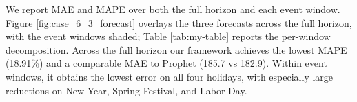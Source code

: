 \documentclass{article}
\theoremstyle{plain}
\theoremstyle{definition}
\theoremstyle{remark}
\begin{document}
We report MAE and MAPE over both the full horizon and each event window. Figure \ref{fig:case_6_3_forecast} overlays the three forecasts across the full horizon, with the event windows shaded; Table \ref{tab:my-table} reports the per-window decomposition. Across the full horizon our framework achieves the lowest MAPE (18.91\%) and a comparable MAE to Prophet (185.7 vs 182.9). Within event windows, it obtains the lowest error on all four holidays, with especially large reductions on New Year, Spring Festival, and Labor Day.



\begin{table}[htbp]
\centering
\label{tab:my-table}
\caption{Long horizon event forecasting}
\end{table}
\end{document}
